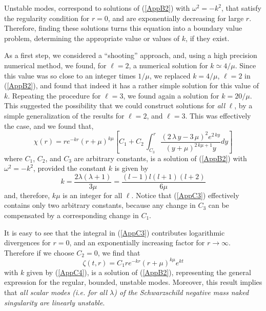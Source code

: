 \documentclass[12pt,aps,floats,showpacs,amssymb,tightenlines]{revtex4}
\begin{document}
Unstable modes, correspond to solutions of (\ref{AppB2}) with $\omega^2 =-k^2$, that
 satisfy the regularity condition for $r=0$, and are exponentially decreasing for large $r$.
  Therefore, finding these solutions  turns this equation into a boundary value problem,
  determining the appropriate value or values of $k$, if they exist.

As a first step, we considered a ``shooting'' approach, and, using a high precision
numerical method, we found, for $\ell=2$, a numerical solution for $k \simeq 4/\mu$.
Since this value was so close to an integer times $1/\mu$, we
replaced $k = 4/\mu$, $\ell=2$ in (\ref{AppB2}), and found that indeed it has a rather
simple solution for this value of $k$. Repeating the procedure for $\ell=3$, we found again
a solution for $k=20/\mu$. This suggested the possibility that we could construct solutions
 for {\em all} $\ell$, by a simple generalization of the results for $\ell=2$, and $\ell=3$.
 This was effectively the case, and we found that,
\begin{equation}
\label{AppC3}
 {\chi} ( r )  = r{e^{-kr}} \left( r+\mu \right) ^{k\mu}
 \left[ {C_1}+{C_2}\,\int _{{C_3}}^{r}\!{\frac { \left( 2\,
\lambda\,y-3\,\mu \right) ^{2}{e^{2\,ky}}}{ \left( y+\mu \right) ^{2\,
k\mu+1}y}}{dy} \right]
\end{equation}
where $C_1$, $C_2$, and $C_3$ are arbitrary constants, is a solution of (\ref{AppB2}) with
$\omega^2=-k^2$, provided  the constant $k$ is given by
\begin{equation}
\label{AppC4}
 k = \frac{2\lambda (\lambda+1)}{3 \mu}=\frac{ (l-1) l (l+1) (l+2)} {6 \mu}
\end{equation}
and, therefore, $k\mu$ is an integer for all $\ell$. Notice that (\ref{AppC3}) effectively
 contains only two arbitrary constants, because any change in $C_3$ can be compensated by a
 corresponding change in $C_1$.

It is easy to see that the integral in (\ref{AppC3}) contributes logarithmic divergences for
 $r=0$, and an exponentially increasing factor for $r \rightarrow \infty$. Therefore if we
 choose $C_2=0$, we find that
\begin{equation}
\label{AppC5}
 {\zeta} ( t, r )  = C_1 r{e^{-kr}} \left( r+\mu \right) ^{k\mu}e^{kt}
\end{equation}
with $k$ given by (\ref{AppC4}), is a solution of (\ref{AppB2}), representing
 the general expression for the regular, bounded, unstable modes.
Moreover, this result implies that {\em all scalar modes (i.e. for all $\lambda$) of the Schwarzschild negative
mass naked singularity are linearly unstable}.
\end{document}
